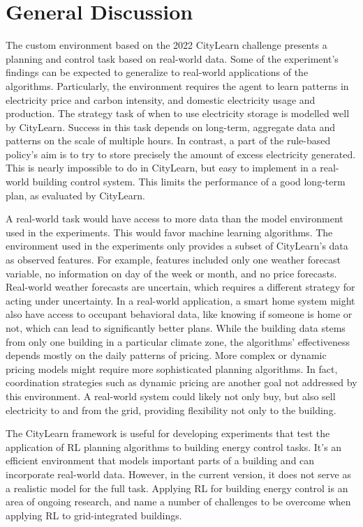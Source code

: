 \section{General Discussion}
The custom environment based on the 2022 CityLearn challenge presents a planning and control task based on real-world data.
Some of the experiment's findings can be expected to generalize to real-world applications of the algorithms.
Particularly, the environment requires the agent to learn patterns in electricity price and carbon intensity, and domestic electricity usage and production.
The strategy task of when to use electricity storage is modelled well by CityLearn.
Success in this task depends on long-term, aggregate data and patterns on the scale of multiple hours.
In contrast, a part of the rule-based policy's aim is to try to store precisely the amount of excess electricity generated. This is nearly impossible to do in CityLearn, but easy to implement in a real-world building control system.
This limits the performance of a good long-term plan, as evaluated by CityLearn.

A real-world task would have access to more data than the model environment used in the experiments. This would favor machine learning algorithms.
The environment used in the experiments only provides a subset of CityLearn's data as observed features.
For example, features included only one weather forecast variable, no information on day of the week or month, and no price forecasts.
Real-world weather forecasts are uncertain, which requires a different strategy for acting under uncertainty.
In a real-world application, a smart home system might also have access to occupant behavioral data, like knowing if someone is home or not, which can lead to significantly better plans.
While the building data stems from only one building in a particular climate zone, the algorithms' effectiveness depends mostly on the daily patterns of pricing.
More complex or dynamic pricing models might require more sophisticated planning algorithms.
In fact, coordination strategies such as dynamic pricing are another goal not addressed by this environment.
A real-world system could likely not only buy, but also sell electricity to and from the grid, providing flexibility not only to the building.

The CityLearn framework is useful for developing experiments that test the application of RL planning algorithms to building energy control tasks.
It's an efficient environment that models important parts of a building and can incorporate real-world data.
However, in the current version, it does not serve as a realistic model for the full task.
Applying RL for building energy control is an area of ongoing research, and \cite{nweye2022RealworldChallengesMultiagent} name a number of challenges to be overcome when applying RL to grid-integrated buildings.

